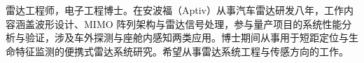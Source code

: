 %


\begin{cvparagraph}
    雷达工程师，电子工程博士。在安波福（Aptiv）从事汽车雷达研发八年，工作内容涵盖波形设计、MIMO 阵列架构与雷达信号处理，参与量产项目的系统性能分析与验证，涉及车外探测与座舱内感知两类应用。博士期间从事用于短距定位与生命特征监测的便携式雷达系统研究。希望从事雷达系统工程与传感方向的工作。
\end{cvparagraph}
